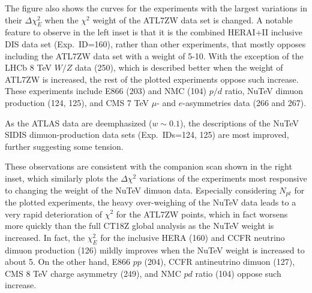 The figure also shows the curves for the experiments with the largest
variations in their $\Delta \chi^2_E$ when the $\chi^2$ weight of the
ATL7ZW data set is changed. 
A notable feature to observe in the left inset
is that it is the combined HERAI+II
inclusive DIS data set (Exp.~ID=160), rather than other experiments, that mostly
opposes including the ATL7ZW data set with a weight of 5-10.
With the exception of the LHCb 8 TeV $W/Z$
data (250), which is described better when the weight of ATL7ZW
is increased, the rest of the plotted experiments oppose such increase.
These experiments include E866 (203) and NMC (104) $p/d$ ratio,
NuTeV dimuon production (124, 125), and CMS 7 TeV $\mu$- and $e$-asymmetries
data (266 and 267).

As the ATLAS data are deemphasized ($w\!\sim\!0.1$),
the descriptions of the NuTeV SIDIS
dimuon-production data sets (Exp.~IDs=124, 125) are most improved,
further suggesting some tension.

These observations are consistent with the companion scan shown in
the right inset, which
similarly plots the $\Delta \chi^2$ variations of the experiments most
responsive to changing the weight of the NuTeV dimuon data.
Especially considering $N_{pt}$ for the plotted
experiments, the heavy over-weighing of the NuTeV data
leads to a very rapid deterioration of $\chi^2$ for the ATL7ZW points,
which in fact worsens more quickly than the full
CT18Z global analysis as the NuTeV weight is increased.
In fact, the $\chi^2_E$ for the inclusive HERA (160) and CCFR neutrino
dimuon production (126) mildly improves when the NuTeV weight is
increased to about 5. On the other hand, E866 $pp$ (204), CCFR
antineutrino dimuon (127), CMS 8 TeV charge asymmetry (249), and NMC $pd$
ratio (104) oppose such increase. 

